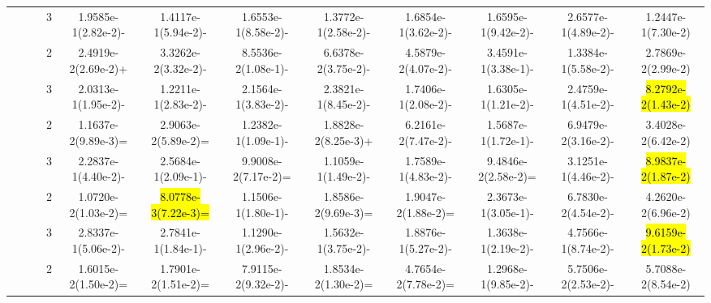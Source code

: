 \documentclass[a4paper,fleqn]{cas-dc}
\newcommand{\highlight}[1]{
	\begingroup
	\sethlcolor{Seashell}%
	\hl{#1}%
	\endgroup
}
\begin{document}
\begin{sloppypar}
\begin{table}[ht]
{\begin{tabular}{ccccccccccc}
					\multirow{8}{*}{~}&\multirow{2}{*}{~}&3&1.9585e-1(2.82e-2)-		&1.4117e-1(5.94e-2)-	&1.6553e-1(8.58e-2)-	&1.3772e-1(2.58e-2)-	&1.6854e-1(3.62e-2)-	&1.6595e-1(9.42e-2)-	&2.6577e-1(4.89e-2)-	&1.2447e-1(7.30e-2)\\
					
					
					
					\multirow{8}{*}{~}&\multirow{2}{*}{ZCAT10}&2 &2.4919e-2(2.69e-2)+	&3.3262e-2(3.32e-2)-	&8.5536e-2(1.08e-1)-	&6.6378e-2(3.75e-2)-	&4.5879e-2(4.07e-2)-	&3.4591e-1(3.38e-1)-	&1.3384e-1(5.58e-2)-	&2.7869e-2(2.99e-2)\\
					
					\multirow{8}{*}{~}&\multirow{2}{*}{~}&3	 &2.0313e-1(1.95e-2)-		&1.2211e-1(2.83e-2)-	&2.1564e-1(3.83e-2)-	&2.3821e-1(8.45e-2)-	&1.7406e-1(2.08e-2)-	&1.6305e-1(1.21e-2)-	&2.4759e-1(4.51e-2)-	&\highlight{8.2792e-2(1.43e-2)}\\
					\hline
					
					\multirow{6}{*}{Disconnected}&\multirow{2}{*}{ZCAT11}&2	&1.1637e-2(9.89e-3)=	&2.9063e-2(5.89e-2)=	&1.2382e-1(1.09e-1)-	&1.8828e-2(8.25e-3)+	&6.2161e-2(7.47e-2)-	&1.5687e-1(1.72e-1)-	&6.9479e-2(3.16e-2)-	&3.4028e-2(6.42e-2)\\
					
					\multirow{6}{*}{~}&\multirow{2}{*}{~}&3	&2.2837e-1(4.40e-2)-		&2.5684e-1(2.09e-1)-	&9.9008e-2(7.17e-2)=	&1.1059e-1(1.49e-2)-	&1.7589e-1(4.83e-2)-	&9.4846e-2(2.58e-2)=	&3.1251e-1(4.46e-2)-	&\highlight{8.9837e-2(1.87e-2)}\\
					
					
					
					\multirow{6}{*}{~}&\multirow{2}{*}{ZCAT12}&2 &1.0720e-2(1.03e-2)=		&\highlight{8.0778e-3(7.22e-3)=}	&1.1506e-1(1.80e-1)-	&1.8586e-2(9.69e-3)=	&1.9047e-2(1.88e-2)=	&2.3673e-1(3.05e-1)-	&6.7830e-2(4.54e-2)-	&4.2620e-2(6.96e-2)\\
					
					\multirow{6}{*}{~}&\multirow{2}{*}{~}&3	&2.8337e-1(5.06e-2)-		&2.7841e-1(1.84e-1)-	&1.1290e-1(2.96e-2)-	&1.5632e-1(3.75e-2)-	&1.8876e-1(5.27e-2)-	&1.3638e-1(2.19e-2)-	&4.7566e-1(8.74e-2)-	&\highlight{9.6159e-2(1.73e-2)}\\
					
					
					\multirow{6}{*}{~}&\multirow{2}{*}{ZCAT13}&2 &1.6015e-2(1.50e-2)=		&1.7901e-2(1.51e-2)=	&7.9115e-2(9.32e-2)-	&1.8534e-2(1.30e-2)=	&4.7654e-2(7.78e-2)=	&1.2968e-1(9.85e-2)-	&5.7506e-2(2.53e-2)-	&5.7088e-2(8.54e-2)\\
					

\end{tabular}}
\end{table}
\end{sloppypar}
\end{document}
